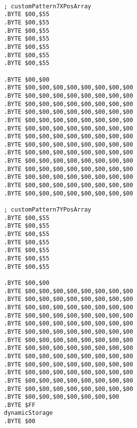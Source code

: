 \begin{minipage}[b]{0.33\linewidth}
\begin{lrbox}{\mybox}%
\begin{lstlisting}[basicstyle=\ttfamily\tiny]

; customPattern7XPosArray
.BYTE $00,$55
.BYTE $00,$55
.BYTE $00,$55
.BYTE $00,$55
.BYTE $00,$55
.BYTE $00,$55
.BYTE $00,$55

.BYTE $00,$00
.BYTE $00,$00,$00,$00,$00,$00,$00,$00
.BYTE $00,$00,$00,$00,$00,$00,$00,$00
.BYTE $00,$00,$00,$00,$00,$00,$00,$00
.BYTE $00,$00,$00,$00,$00,$00,$00,$00
.BYTE $00,$00,$00,$00,$00,$00,$00,$00
.BYTE $00,$00,$00,$00,$00,$00,$00,$00
.BYTE $00,$00,$00,$00,$00,$00,$00,$00
.BYTE $00,$00,$00,$00,$00,$00,$00,$00
.BYTE $00,$00,$00,$00,$00,$00,$00,$00
.BYTE $00,$00,$00,$00,$00,$00,$00,$00
.BYTE $00,$00,$00,$00,$00,$00,$00,$00
.BYTE $00,$00,$00,$00,$00,$00,$00,$00
.BYTE $00,$00,$00,$00,$00,$00,$00,$00
.BYTE $00,$00,$00,$00,$00,$00,$00,$00

; customPattern7YPosArray
.BYTE $00,$55
.BYTE $00,$55
.BYTE $00,$55
.BYTE $00,$55
.BYTE $00,$55
.BYTE $00,$55
.BYTE $00,$55

.BYTE $00,$00
.BYTE $00,$00,$00,$00,$00,$00,$00,$00
.BYTE $00,$00,$00,$00,$00,$00,$00,$00
.BYTE $00,$00,$00,$00,$00,$00,$00,$00
.BYTE $00,$00,$00,$00,$00,$00,$00,$00
.BYTE $00,$00,$00,$00,$00,$00,$00,$00
.BYTE $00,$00,$00,$00,$00,$00,$00,$00
.BYTE $00,$00,$00,$00,$00,$00,$00,$00
.BYTE $00,$00,$00,$00,$00,$00,$00,$00
.BYTE $00,$00,$00,$00,$00,$00,$00,$00
.BYTE $00,$00,$00,$00,$00,$00,$00,$00
.BYTE $00,$00,$00,$00,$00,$00,$00,$00
.BYTE $00,$00,$00,$00,$00,$00,$00,$00
.BYTE $00,$00,$00,$00,$00,$00,$00,$00
.BYTE $00,$00,$00,$00,$00,$00,$00
.BYTE $FF
dynamicStorage
.BYTE $00
\end{lstlisting}
\end{lrbox}%
\scalebox{0.8}{\usebox{\mybox}}
\end{minipage}
